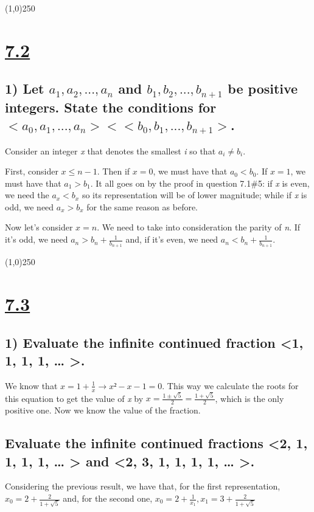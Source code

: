\documentclass[11pt]{article}
\begin{document}
\begin{center}
\line(1,0){250}
\end{center}

\section*{\underline{7.2}}
\label{sec:org91bfe2b}
\subsection*{1) Let \(a_1, a_2 ,...,a_n\) and \(b_1, b_2, ..., b_{n+1}\) be positive integers. State the conditions for \(<a_0, a_1, ..., a_n> < <b_0, b_1, ..., b_{n+1}>\).}
\label{sec:org6437436}
Consider an integer \emph{x} that denotes the smallest \emph{i} so that \(a_i \not= b_i\).

First, consider \(x \le n-1\). Then if \(x = 0\), we must have that \(a_0 < b_0\). If \(x = 1\), we must have that \(a_1 > b_1\). It all goes on by the proof in question 7.1\#5: if \emph{x} is even, we need the \(a_x < b_x\) so its representation will be of lower magnitude; while if \emph{x} is odd, we need \(a_x > b_x\) for the same reason as before.

Now let's consider \(x = n\). We need to take into consideration the parity of \emph{n}. If it's odd, we need \(a_n > b_n + \frac{1}{b_{n+1}}\) and, if it's even, we need \(a_n < b_n + \frac{1}{b_{n+1}}\).

\begin{center}
\line(1,0){250}
\end{center}

\section*{\underline{7.3}}
\label{sec:org443db0b}
\subsection*{1) Evaluate the infinite continued fraction <1, 1, 1, 1, \ldots{} >.}
\label{sec:org9f2bacb}
We know that \(x = 1 + \frac{1}{x} \to x² - x - 1 = 0\). This way we calculate the roots for this equation to get the value of \emph{x} by \(x = \frac{1 \pm \sqrt{5}}{2} = \frac{1 + \sqrt{5}}{2}\), which is the only positive one. Now we know the value of the fraction.
\subsection*{Evaluate the infinite continued fractions <2, 1, 1, 1, 1, \ldots{} > and <2, 3, 1, 1, 1, 1, \ldots{} >.}
\label{sec:org78cd41b}
Considering the previous result, we have that, for the first representation, \(x_0 = 2 + \frac{2}{1 + \sqrt5}\) and, for the second one, \(x_0 = 2 + \frac{1}{x_1}, x_1 = 3 + \frac{2}{1 + \sqrt5}\)
\end{document}
